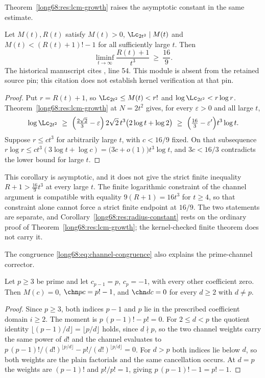 Theorem~\ref{long68:res:lcm-growth} raises the asymptotic constant in the same
estimate.

\begin{corollary}\label{long68:res:radius-constant}
Let $M(t),R(t)$ satisfy $M(t)>0$, $\Lc_{2t^2}\mid M(t)$ and
$M(t)<(R(t)+1)!-1$ for all sufficiently large $t$.  Then
\[
 \liminf_{t\to\infty}\frac{R(t)+1}{t^3}\ \ge\ \frac{16}{9}.
\]
  The historical manuscript cites , line 54. This module is absent from the retained source pin; this citation does not establish kernel verification at that pin.
\end{corollary}

\begin{proof}
Put $r=R(t)+1$, so $\Lc_{2t^2}\le M(t)<r!$ and $\log \Lc_{2t^2}<r\log r$.
Theorem~\ref{long68:res:lcm-growth} at $N=2t^2$ gives, for every $\varepsilon>0$ and
all large $t$,
\[
 \log \Lc_{2t^2}
 \ \ge\ \Bigl(\tfrac{2\sqrt2}{3}-\varepsilon\Bigr)\,2\sqrt2\,t^3
   \bigl(2\log t+\log2\bigr)
 \ \ge\ \Bigl(\tfrac{16}{3}-\varepsilon'\Bigr)t^3\log t .
\]
Suppose $r\le ct^3$ for arbitrarily large $t$, with $c<16/9$ fixed.  On that
subsequence $r\log r\le ct^3(3\log t+\log c)=\bigl(3c+o(1)\bigr)t^3\log t$,
and $3c<16/3$ contradicts the lower bound for large $t$.
\end{proof}

This corollary is asymptotic, and it does not give the strict finite
inequality $R+1>\tfrac{16}9t^3$ at every large $t$.  The finite logarithmic
constraint of the channel argument is compatible with equality
$9(R+1)=16t^3$ for $t\ge4$, so that constraint alone cannot force a strict
finite endpoint at $16/9$.  The two statements are separate, and
Corollary~\ref{long68:res:radius-constant} rests on the ordinary proof of
Theorem~\ref{long68:res:lcm-growth}; the kernel-checked finite theorem does not
carry it.

The congruence \eqref{long68:eq:channel-congruence} also explains the prime-channel
corrector.

\begin{theorem}\label{long68:res:translator}
Let $p\ge3$ be prime and let $c_{p-1}=p$, $c_p=-1$, with every other coefficient
zero.  Then $M(c)=0$, $\chn pc=p!-1$, and $\chn dc=0$ for every $d\ge2$ with
$d\ne p$.
\end{theorem}

\begin{proof}
Since $p\ge3$, both indices $p-1$ and $p$ lie in the prescribed coefficient
domain $i\ge2$.  The moment is $p\,(p-1)!-p!=0$.  For $2\le d<p$ the quotient identity
$\lfloor(p-1)/d\rfloor=\lfloor p/d\rfloor$ holds, since $d\nmid p$, so the
two channel weights carry the same power of $d!$ and the channel evaluates to
$p\,(p-1)!/(d!)^{\lfloor p/d\rfloor}-p!/(d!)^{\lfloor p/d\rfloor}=0$.  For
$d>p$ both indices lie below $d$, so both weights are the plain factorials
and the same cancellation occurs.  At $d=p$ the weights are $(p-1)!$ and
$p!/p!=1$, giving $p\,(p-1)!-1=p!-1$.
\end{proof}

